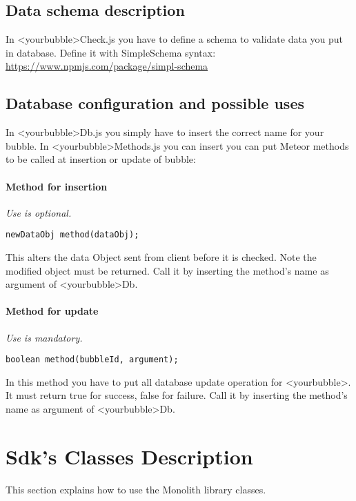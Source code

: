 \subsection{Data schema description}
In <yourbubble>Check.js you have to define a schema to validate data you put in
database.
Define it with SimpleSchema syntax:
\url{https://www.npmjs.com/package/simpl-schema}

\subsection{Database configuration and possible uses}

In <yourbubble>Db.js you simply have to insert the correct name for your
bubble.
In <yourbubble>Methods.js you can insert you can put Meteor methods to
be called at insertion or update of bubble:
\paragraph{Method for insertion} \emph{Use is optional.} 

\begin{lstlisting}
newDataObj method(dataObj);
\end{lstlisting}

This alters the data Object sent from client before it is
checked. Note the modified object must be returned.
Call it by inserting the method's name as argument of <yourbubble>Db.

\paragraph{Method for update} \emph{Use is mandatory.} 

\begin{lstlisting}
boolean method(bubbleId, argument);
\end{lstlisting}

In this method you have to put all database update operation for
<yourbubble>. It must return true for success, false for failure.
Call it by inserting the method's name as argument of <yourbubble>Db.




\section{Sdk's Classes Description}
This section explains how to use the Monolith library classes.

